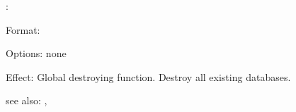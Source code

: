 \colab{} \destroy:

Format: 

Options: none

Effect: Global destroying function.
        Destroy all existing \COLAB{} databases.

see also: \consult, \replace
